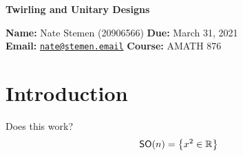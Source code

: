 \documentclass[11pt,english]{article}
\theoremstyle{definition}
\begin{document}
\thispagestyle{plain}
\begin{center}
	\textsf{\textbf{\LARGE Twirling and Unitary Designs}}
\end{center}
\textbf{Name:} Nate Stemen (20906566) \hspace{\fill} \textbf{Due:} March 31, 2021 \\
\textbf{Email:} \href{mailto:nate@stemen.email}{\texttt{nate@stemen.email}} \hspace{\fill} \textbf{Course:} AMATH 876


\begingroup
{}
\hypersetup{linkcolor=darkblue}
\tableofcontents
\endgroup

\vspace{0.5cm}

\section{Introduction}
Does this work?
\begin{equation*}
	\mathsf{SO}(n) = \qty{x^2\in\mathbb{R}}
\end{equation*}

\cite{designs-and-codes}

\nocite{*}

\clearpage


\end{document}
